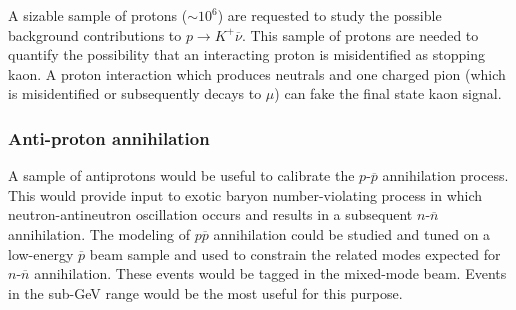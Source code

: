 A sizable sample of protons ($\sim 10^6$)
are requested to study the possible background contributions to  $p \rightarrow K^+ \overline{\nu}$.
This sample of  protons are needed to quantify the possibility that an interacting proton 
is  misidentified as stopping kaon. A proton interaction which produces neutrals and one charged pion 
(which is misidentified or subsequently decays to $\mu$) can fake the final state kaon signal.


\subsubsection{Anti-proton annihilation }

A sample of antiprotons would be useful to calibrate the $p$-$\overline{p}$ annihilation process. 
This would provide input to exotic baryon number-violating process in which neutron-antineutron oscillation
occurs and results in a
subsequent  $n$-$\overline{n}$ annihilation. The modeling of $p\overline{p}$ annihilation could be
studied and tuned on a low-energy $\overline{p}$ beam sample and used to constrain the related modes 
expected for  $n$-$\overline{n}$ annihilation. These events would be tagged in the 
mixed-mode beam. Events in the sub-GeV range would be the most useful for this purpose.




